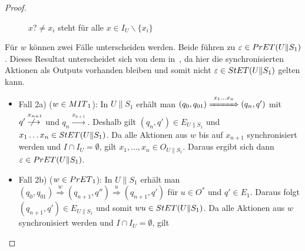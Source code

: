 \begin{proof}
\begin{itemize}
\begin{figure} [h!tbp]
\begin{center}
        \caption{$x?\neq x_i$ steht für alle $x\in I_U\backslash\{x_i\}$}
\label{UohneE}
      \end{center}
      \end{figure}
      Für $w$ können zwei Fälle unterscheiden werden. Beide führen zu
      $\varepsilon\in PrET{}(U\|S_1)$. Dieses Resultat unterscheidet sich von dem
      in~\cite{Vogler2014EIO}, da hier die synchronisierten Aktionen als Outputs
      vorhanden bleiben und somit nicht $\varepsilon\in StET{}(U\|S_1)$ gelten
      kann.
      \begin{itemize}
        \item Fall 2a) ($w\in MIT{}_1$): In $U\|S_1$ erhält man
          $(q_0,q_{01}) \overset{x_1\dots x_n}{\xRightarrow{\hspace{1cm}}} (q_n,q')$ mit
          $q' \overset{x_{n+1}}{\not{\hspace{-0.2cm}\longrightarrow}}$ und $q_n
          \overset{x_{n+1}}{\longrightarrow}$. Deshalb gilt $(q_n,q')\in
          E_{U\|S_1}$ und $x_1\dots x_n\in StET{}(U\|S_1)$. Da alle Aktionen aus
          $w$ bis auf $x_{n+1}$ synchronisiert werden und $I\cap I_U =
          \emptyset$, gilt $x_1,\dots ,x_n\in
          O_{U\|S_1}$. Daraus ergibt sich dann $\varepsilon\in PrET{}(U\|S_1)$.
        \item Fall 2b) ($w\in PrET{}_1$): In $U\|S_1$ erhält man
          $(q_0,q_{01}) \overset{w}{\Rightarrow} (q_{n+1},q'')
          \overset{u}{\Rightarrow} (q_{n+1},q')$ für $u\in O^*$ und $q'\in
          E_1$. Daraus folgt $(q_{n+1},q')\in E_{U\|S_1}$ und somit $wu\in
          StET{}(U\|S_1)$. Da alle Aktionen aus $w$ synchronisiert werden und
          $I\cap I_U = \emptyset$, gilt

\end{itemize}
\end{itemize}
\end{proof}
